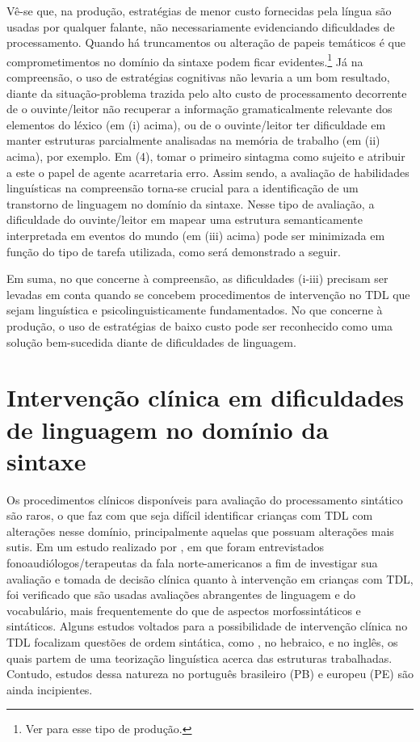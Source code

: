 \documentclass[output=paper,colorlinks,citecolor=brown,booklanguage=portuguese]{langscibook}
\begin{document}
Vê-se que, na produção, estratégias de menor custo fornecidas pela língua são usadas por qualquer falante, não necessariamente evidenciando dificuldades de processamento. Quando há truncamentos ou alteração de papeis temáticos é que comprometimentos no domínio da sintaxe podem ficar evidentes.\footnote{Ver \citet{Correa2021} para esse tipo de produção.} Já na compreensão, o uso de estratégias cognitivas não levaria a um bom resultado, diante da situação-problema trazida pelo alto custo de processamento decorrente de o ouvinte/leitor não recuperar a informação gramaticalmente relevante dos elementos do léxico (em (i) acima), ou de o ouvinte/leitor ter dificuldade em manter estruturas parcialmente analisadas na memória de trabalho (em (ii) acima), por exemplo. Em (4), tomar o primeiro sintagma como sujeito e atribuir a este o papel de agente acarretaria erro. Assim sendo, a avaliação de habilidades linguísticas na compreensão torna-se crucial para a identificação de um transtorno de linguagem no domínio da sintaxe. Nesse tipo de avaliação, a dificuldade do ouvinte/leitor em mapear uma estrutura semanticamente interpretada em eventos do mundo (em (iii) acima) pode ser minimizada em função do tipo de tarefa utilizada, como será demonstrado a seguir. 

Em suma, no que concerne à compreensão, as dificuldades (i-iii) precisam ser levadas em conta quando se concebem procedimentos de intervenção no TDL que sejam linguística e psicolinguisticamente fundamentados. No que concerne à produção, o uso de estratégias de baixo custo pode ser reconhecido como uma solução bem-sucedida diante de dificuldades de linguagem.


\section{Intervenção clínica em dificuldades de linguagem no domínio da sintaxe }
Os procedimentos clínicos disponíveis para avaliação do processamento sintático são raros, o que faz com que seja difícil identificar crianças com TDL com alterações nesse domínio, principalmente aquelas que possuam alterações mais sutis. Em um estudo realizado por \citet{Selin2019}, em que foram entrevistados fonoaudiólogos/terapeutas da fala norte-americanos a fim de investigar sua avaliação e tomada de decisão clínica quanto à intervenção em crianças com TDL, foi verificado que são usadas avaliações abrangentes de linguagem e do vocabulário, mais frequentemente do que de aspectos morfossintáticos e sintáticos. Alguns estudos voltados para a possibilidade de intervenção clínica no TDL focalizam questões de ordem sintática, como \citet{Levy2009}, no hebraico, e \citet{Balthazar2018} no inglês, os quais partem de uma teorização linguística acerca das estruturas trabalhadas. Contudo, estudos dessa natureza no português brasileiro (PB) e europeu (PE) são ainda incipientes. 
\end{document}

